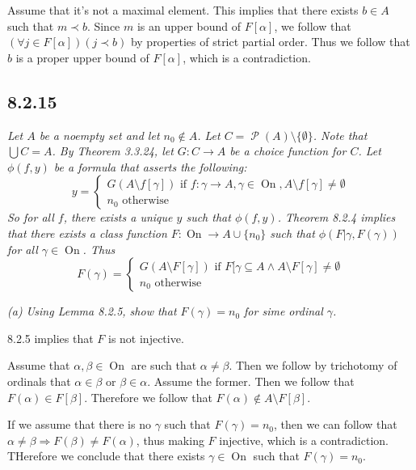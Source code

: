 \documentclass[11pt,oneside,titlepage]{book}
\DeclareMathOperator \pow {\mathcal {P}}
\DeclareMathOperator \ra {\Rightarrow}
\DeclareMathOperator \On {On}
\newcommand{\set}[1]{\{ #1 \}}
\begin{document}
Assume that it's not a maximal element. This implies that there exists $b \in A$
such that $m \prec b$. Since $m$ is an upper bound of $F[\alpha]$, we follow that
$(\forall j \in F[\alpha])(j \prec b )$ by properties of strict partial order.
Thus we follow that $b$ is a proper upper bound of $F[\alpha]$, which is a contradiction.


\subsection*{8.2.15}

\textit{Let $A$ be a noempty set and let $n_0 \notin A$. Let
  $C = \pow(A) \setminus \set{\emptyset}$. Note that $\bigcup{C} = A$. By Theorem 3.3.24,
  let $G: C \to A$ be a choice function for $C$. Let $\phi(f, y)$ be a formula that
  asserts the following:
  $$y =
  \begin{cases}
    G(A \setminus f[\gamma]) \text{ if } f: \gamma \to A, \gamma \in \On,
    A \setminus f[\gamma] \neq \emptyset \\
    n_0 \text{ otherwise}
  \end{cases}
  $$
  So for all $f$, there exists a unique $y$ such that $\phi(f, y)$. Theorem 8.2.4
  implies that there exists a class function $F: \On \to A \cup \set{n_0}$ such that
  $\phi(F | \gamma, F(\gamma))$ for all $\gamma \in \On$. Thus
  $$F(\gamma) =
  \begin{cases}
    G(A \setminus F[\gamma]) \text { if } F[\gamma \subseteq A \land A \setminus F[\gamma] \neq
    \emptyset \\
    n_0 \text{ otherwise}
  \end{cases}
  $$
}

\textit{(a) Using Lemma 8.2.5, show that $F(\gamma) = n_0$ for sime ordinal $\gamma$. }

8.2.5 implies that $F$ is not injective.

Assume that $\alpha, \beta \in \On$ are such that $\alpha \neq \beta$. Then we follow by
trichotomy of ordinals that $\alpha \in \beta$ or $\beta \in \alpha$.
Assume the former. Then we follow that $F(\alpha) \in F[\beta]$.
Therefore we follow that $F(\alpha) \notin A \setminus F[\beta]$.

If we assume that there is no $\gamma$ such that $F(\gamma) = n_0$, then we can follow that
$\alpha \neq \beta \ra F(\beta) \neq F(\alpha)$, thus making $F$ injective, which is a
contradiction. THerefore we conclude that there exists $\gamma \in \On$ such that
$F(\gamma) = n_0$.
\end{document}
